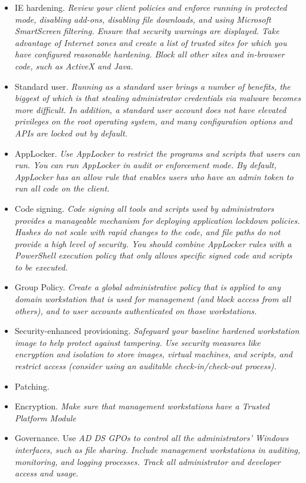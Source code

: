 \begin{itemize}
\item IE hardening. \textit{Review your client policies and enforce running in protected mode, disabling add-ons, disabling file downloads, and using Microsoft SmartScreen filtering. Ensure that security warnings are displayed. Take advantage of Internet zones and create a list of trusted sites for which you have configured reasonable hardening. Block all other sites and in-browser code, such as ActiveX and Java.}
\item Standard user. \textit{Running as a standard user brings a number of benefits, the biggest of which is that stealing administrator credentials via malware becomes more difficult. In addition, a standard user account does not have elevated privileges on the root operating system, and many configuration options and APIs are locked out by default.}
\item AppLocker. \textit{Use AppLocker to restrict the programs and scripts that users can run. You can run AppLocker in audit or enforcement mode. By default, AppLocker has an allow rule that enables users who have an admin token to run all code on the client.}
\item Code signing. \textit{Code signing all tools and scripts used by administrators provides a manageable mechanism for deploying application lockdown policies. Hashes do not scale with rapid changes to the code, and file paths do not provide a high level of security. You should combine AppLocker rules with a PowerShell execution policy that only allows specific signed code and scripts to be executed.}
\item Group Policy. \textit{Create a global administrative policy that is applied to any domain workstation that is used for management (and block access from all others), and to user accounts authenticated on those workstations.}
\item Security-enhanced provisioning. \textit{Safeguard your baseline hardened workstation image to help protect against tampering. Use security measures like encryption and isolation to store images, virtual machines, and scripts, and restrict access (consider using an auditable check-in/check-out process).}
\item Patching. 
\item Encryption. \textit{Make sure that management workstations have a Trusted Platform Module}
\item Governance. Use \textit{AD DS GPOs to control all the administrators’ Windows interfaces, such as file sharing. Include management workstations in auditing, monitoring, and logging processes. Track all administrator and developer access and usage.}
\end{itemize}

